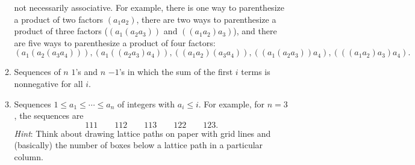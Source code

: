 \begin{enumerate}
\begin{enumerate}
      not necessarily associative. For example, there is one way to
      parenthesize a product of two factors $(a_1a_2)$, there are two
      ways to parenthesize a product of three factors ($(a_1(a_2a_3))$
      and $((a_1a_2)a_3)$), and there are five ways to parenthesize a
      product of four factors: \[(a_1(a_2(a_3a_4))),
      (a_1((a_2a_3)a_4)), ((a_1a_2)(a_3a_4)),
      ((a_1(a_2a_3))a_4), (((a_1a_2)a_3)a_4).\]
    \item Sequences of $n$ $1$'s and $n$ $-1$'s in which the sum of
      the first $i$ terms is nonnegative for all $i$.
    \item Sequences $1\leq a_1\leq \cdots \leq a_n$ of integers with
      $a_i\leq i$. For example, for $n=3$, the sequences are
      \[111\qquad 112\qquad 113\qquad 122\qquad 123.\] \textit{Hint}:
      Think about drawing lattice paths on paper with grid lines and
      (basically) the number of boxes below a lattice path in a
      particular column.
  \end{enumerate}

\end{enumerate}


